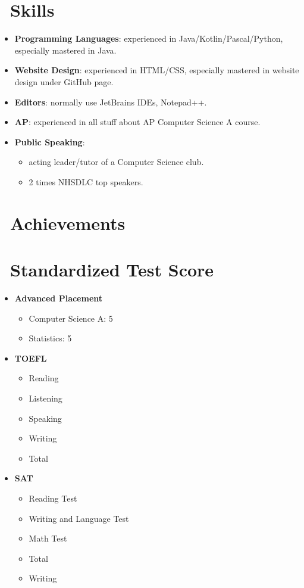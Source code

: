\documentclass{resume}
\begin{document}
{\section{\faCogs\ Skills}
\begin{itemize}[parsep=0.5ex]
  \item \textbf{Programming Languages}:
    experienced in Java/Kotlin/Pascal/Python, especially mastered in Java.
  \item \textbf{Website Design}:
	experienced in HTML/CSS, especially mastered in website design under GitHub page.
  \item \textbf{Editors}:
    normally use JetBrains IDEs, Notepad++.
  \item \textbf{AP}:
    experienced in all stuff about AP Computer Science A course.
  \item \textbf{Public Speaking}:
	\begin{itemize}[parsep=0.5ex]
	  \item acting leader/tutor of a Computer Science club.
	  \item 2 times NHSDLC top speakers.
	\end{itemize}
\end{itemize}

\section{\faHeartO\ Achievements}

\section{\faUsers\ Standardized Test Score}
\begin{itemize}[parsep=0.5ex]
  \item \textbf{Advanced Placement}
	  \begin{itemize}[parsep=0.5ex]
		  \item Computer Science A: 5
		  \item Statistics: 5
	  \end{itemize}
  \item \textbf{TOEFL}
		\begin{itemize}[parsep=0.5ex]
		  \item Reading
		  \item Listening
		  \item Speaking
		  \item Writing
		  \item Total
	  \end{itemize}
  \item \textbf{SAT}
		\begin{itemize}[parsep=0.5ex]
		  \item Reading Test
		  \item Writing and Language Test
		  \item Math Test
		  \item Total
		  \item Writing
	  \end{itemize}
\end{itemize}	

}
\end{document}
